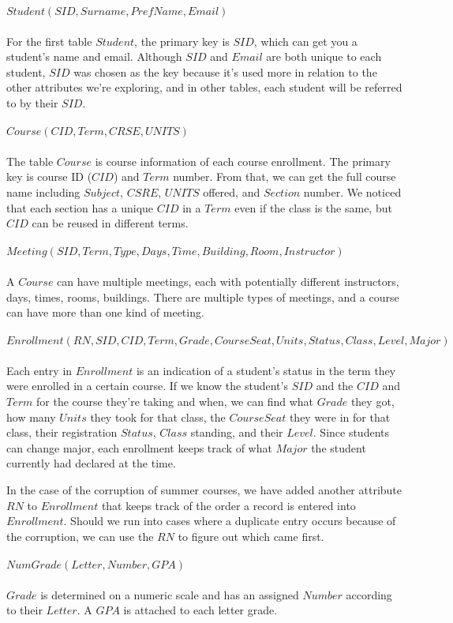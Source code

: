 
$Student(SID, Surname, PrefName, Email)$
\\\\
For the first table $Student$, the primary key is $SID$, which can get you a student's name and email. Although $SID$ and $Email$ are both unique to each student, $SID$ was chosen as the key because it's used more in relation to the other attributes we're exploring, and in other tables, each student will be referred to by their $SID$.
\\\\
$Course(CID, Term, CRSE, UNITS)$
\\\\
The table $Course$ is course information of each course enrollment. The primary key is course ID ($CID$) and $Term$ number. From that, we can get the full course name including $Subject$, $CSRE$, $UNITS$ offered, and $Section$ number. We noticed that each section has a unique $CID$ in a $Term$ even if the class is the same, but $CID$ can be reused in different terms.
\\\\
$Meeting(SID, Term, Type, Days, Time, Building, Room, Instructor)$
\\\\
A $Course$ can have multiple meetings, each with potentially different instructors, days, times, rooms, buildings. There are multiple types of meetings, and a course can have more than one kind of meeting.
\\\\
$Enrollment(RN, SID, CID, Term, Grade, Course Seat, Units, Status, Class, Level, Major)$
\\\\
Each entry in $Enrollment$ is an indication of a student's status in the term they were enrolled in a certain course. If we know the student's $SID$ and the $CID$ and $Term$ for the course they're taking and when, we can find what $Grade$ they got, how many $Units$ they took for that class, the $Course Seat$ they were in for that class, their registration $Status$, $Class$ standing, and their $Level$. Since students can change major, each enrollment keeps track of what $Major$ the student currently had declared at the time.

In the case of the corruption of summer courses, we have added another attribute $RN$ to $Enrollment$ that keeps track of the order a record is entered into $Enrollment$. Should we run into cases where a duplicate entry occurs because of the corruption, we can use the $RN$ to figure out which came first.
\\\\
$NumGrade(Letter, Number, GPA)$
\\\\
$Grade$ is determined on a numeric scale and has an assigned $Number$ according to their $Letter$. A $GPA$ is attached to each letter grade.